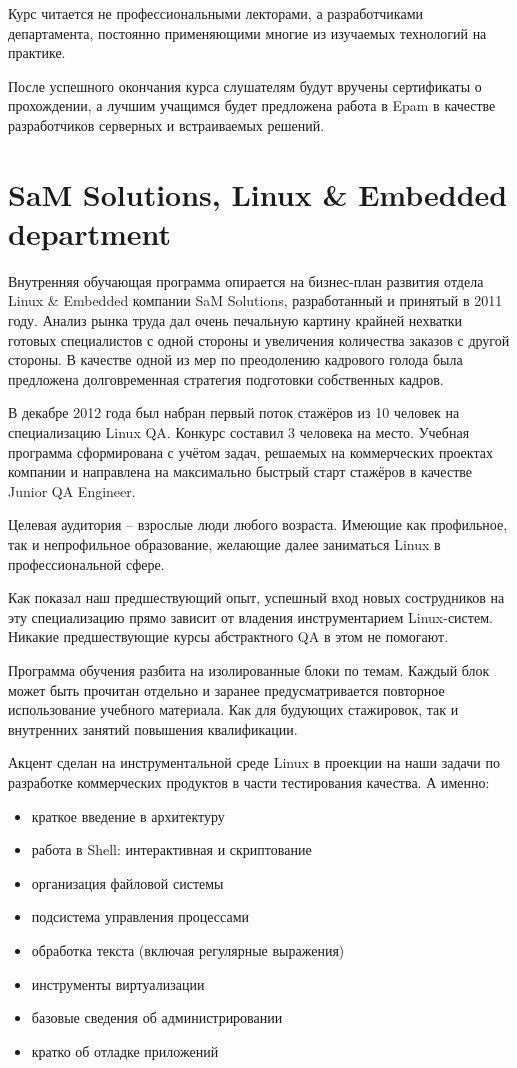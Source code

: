 \documentclass[10pt, a5paper]{article}
\begin{document}
Курс читается не профессиональными лекторами, а разработчиками департамента, постоянно применяющими многие из изучаемых технологий на практике.

После успешного окончания курса слушателям будут вручены сертификаты о прохождении, а лучшим учащимся будет предложена работа в Epam в качестве разработчиков серверных и встраиваемых решений.

\section{SaM Solutions, Linux \& Embedded department}

Внутренняя обучающая программа опирается на бизнес-план развития отдела Linux \& Embedded компании SaM Solutions, разработанный и принятый в 2011 году. Анализ рынка труда дал очень печальную картину крайней нехватки готовых специалистов с одной стороны и увеличения количества заказов с другой стороны. В качестве одной из мер по преодолению кадрового голода была предложена долговременная стратегия подготовки собственных кадров.

В декабре 2012 года был набран первый поток стажёров из 10 человек на специализацию Linux QA. Конкурс составил 3 человека на место. Учебная программа сформирована с учётом задач, решаемых на коммерческих проектах компании и направлена на максимально быстрый старт стажёров в качестве Junior QA Engineer.

Целевая аудитория -- взрослые люди любого возраста. Имеющие как профильное, так и непрофильное образование, желающие далее заниматься Linux в профессиональной сфере.

Как показал наш предшествующий опыт, успешный вход новых сострудников на эту специализацию прямо зависит от владения инструментарием Linux-систем. Никакие предшествующие курсы абстрактного QA в этом не помогают.

Программа обучения разбита на изолированные блоки по темам. Каждый блок может быть прочитан отдельно и заранее предусматривается повторное использование учебного материала. Как для будующих стажировок, так и внутренних занятий повышения квалификации.

Акцент сделан на инструментальной среде Linux в проекции на наши задачи по разработке коммерческих продуктов в части тестирования качества. А именно:

\begin{itemize}
  \item краткое введение в архитектуру
  \item работа в Shell: интерактивная и скриптование
  \item организация файловой системы
  \item подсистема управления процессами
  \item обработка текста (включая регулярные выражения)
  \item инструменты виртуализации
  \item базовые сведения об администрировании
  \item кратко об отладке приложений
\end{itemize}
\end{document}
